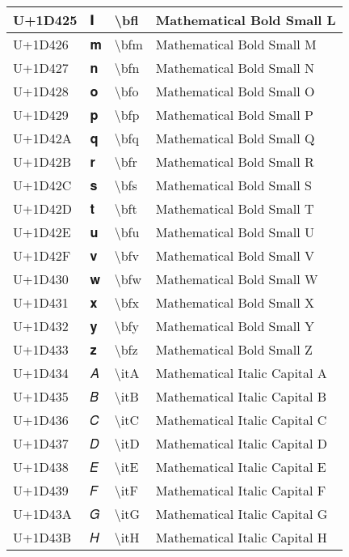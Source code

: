 \begin{table}[h]
\begin{tabulary}{\linewidth}{|L|L|L|L|}
\hline
U+1D425 & 𝐥 & {\textbackslash}bfl & Mathematical Bold Small L \\
\hline
U+1D426 & 𝐦 & {\textbackslash}bfm & Mathematical Bold Small M \\
\hline
U+1D427 & 𝐧 & {\textbackslash}bfn & Mathematical Bold Small N \\
\hline
U+1D428 & 𝐨 & {\textbackslash}bfo & Mathematical Bold Small O \\
\hline
U+1D429 & 𝐩 & {\textbackslash}bfp & Mathematical Bold Small P \\
\hline
U+1D42A & 𝐪 & {\textbackslash}bfq & Mathematical Bold Small Q \\
\hline
U+1D42B & 𝐫 & {\textbackslash}bfr & Mathematical Bold Small R \\
\hline
U+1D42C & 𝐬 & {\textbackslash}bfs & Mathematical Bold Small S \\
\hline
U+1D42D & 𝐭 & {\textbackslash}bft & Mathematical Bold Small T \\
\hline
U+1D42E & 𝐮 & {\textbackslash}bfu & Mathematical Bold Small U \\
\hline
U+1D42F & 𝐯 & {\textbackslash}bfv & Mathematical Bold Small V \\
\hline
U+1D430 & 𝐰 & {\textbackslash}bfw & Mathematical Bold Small W \\
\hline
U+1D431 & 𝐱 & {\textbackslash}bfx & Mathematical Bold Small X \\
\hline
U+1D432 & 𝐲 & {\textbackslash}bfy & Mathematical Bold Small Y \\
\hline
U+1D433 & 𝐳 & {\textbackslash}bfz & Mathematical Bold Small Z \\
\hline
U+1D434 & 𝐴 & {\textbackslash}itA & Mathematical Italic Capital A \\
\hline
U+1D435 & 𝐵 & {\textbackslash}itB & Mathematical Italic Capital B \\
\hline
U+1D436 & 𝐶 & {\textbackslash}itC & Mathematical Italic Capital C \\
\hline
U+1D437 & 𝐷 & {\textbackslash}itD & Mathematical Italic Capital D \\
\hline
U+1D438 & 𝐸 & {\textbackslash}itE & Mathematical Italic Capital E \\
\hline
U+1D439 & 𝐹 & {\textbackslash}itF & Mathematical Italic Capital F \\
\hline
U+1D43A & 𝐺 & {\textbackslash}itG & Mathematical Italic Capital G \\
\hline
U+1D43B & 𝐻 & {\textbackslash}itH & Mathematical Italic Capital H \\

\end{tabulary}
\end{table}
